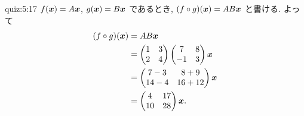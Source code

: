 \begin{answerof}{quiz:5:17}
  $f(\boldsymbol{x})=A\boldsymbol{x}$, $g(\boldsymbol{x})=B\boldsymbol{x}$
  であるとき, $(f\circ g)(\boldsymbol{x})=AB\boldsymbol{x}$
  と書ける. よって
  \begin{align*}
    (f\circ g)(\boldsymbol{x})
    &=AB\boldsymbol{x}\\
    &=\begin{pmatrix}1&3\\2&4\end{pmatrix}\begin{pmatrix}7&8\\-1&3\end{pmatrix}\boldsymbol{x}\\
    &=\begin{pmatrix}7-3&8+9\\14-4&16+12\end{pmatrix}\boldsymbol{x}\\
    &=\begin{pmatrix}4&17\\10&28\end{pmatrix}\boldsymbol{x}.
  \end{align*}
  

\end{answerof}
